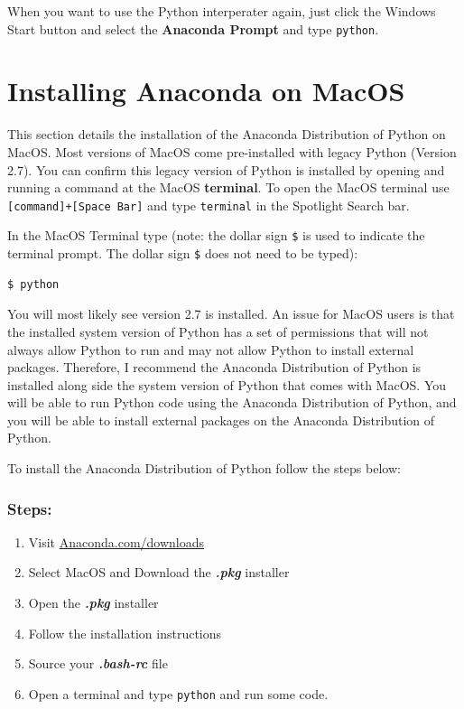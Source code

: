 \documentclass{book}
\begin{document}
When you want to use the Python interperater again, just click the
Windows Start button and select the \textbf{Anaconda Prompt} and type
\lstinline!python!.

    \section{Installing Anaconda on
MacOS}\label{installing-anaconda-on-macos}

    This section details the installation of the Anaconda Distribution of
Python on MacOS. Most versions of MacOS come pre-installed with legacy
Python (Version 2.7). You can confirm this legacy version of Python is
installed by opening and running a command at the MacOS
\textbf{terminal}. To open the MacOS terminal use
\lstinline![command]+[Space Bar]! and type \lstinline!terminal! in the
Spotlight Search bar.

In the MacOS Terminal type (note: the dollar sign \lstinline!$! is used
to indicate the terminal prompt. The dollar sign \lstinline!$! does not
need to be typed):

\begin{lstlisting}
$ python
\end{lstlisting}

You will most likely see version 2.7 is installed. An issue for MacOS
users is that the installed system version of Python has a set of
permissions that will not always allow Python to run and may not allow
Python to install external packages. Therefore, I recommend the Anaconda
Distribution of Python is installed along side the system version of
Python that comes with MacOS. You will be able to run Python code using
the Anaconda Distribution of Python, and you will be able to install
external packages on the Anaconda Distribution of Python.

To install the Anaconda Distribution of Python follow the steps below:

\subsubsection{Steps:}\label{steps}

\begin{enumerate}
\def\labelenumi{\arabic{enumi}.}
\item
  Visit
  \href{https://www.anaconda.com/download/}{Anaconda.com/downloads}
\item
  Select MacOS and Download the \textbf{\emph{.pkg}} installer
\item
  Open the \textbf{\emph{.pkg}} installer
\item
  Follow the installation instructions
\item
  Source your \textbf{\emph{.bash-rc}} file
\item
  Open a terminal and type \lstinline!python! and run some code.
\end{enumerate}
\end{document}
